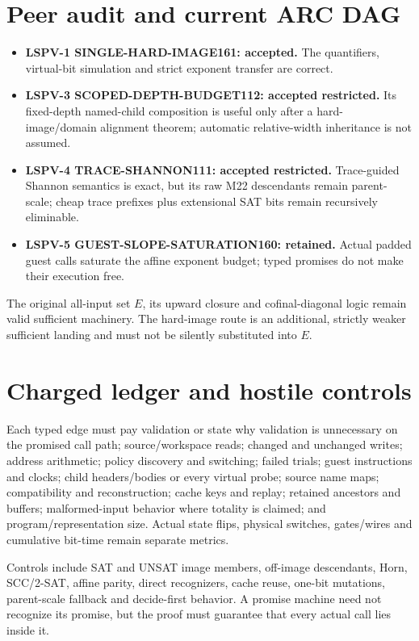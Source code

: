 \documentclass[11pt]{article}
\begin{document}
\section{Peer audit and current ARC DAG}
\begin{itemize}
\item \textbf{LSPV-1 SINGLE-HARD-IMAGE161: accepted.}  The quantifiers,
virtual-bit simulation and strict exponent transfer are correct.
\item \textbf{LSPV-3 SCOPED-DEPTH-BUDGET112: accepted restricted.}  Its
fixed-depth named-child composition is useful only after a hard-image/domain
alignment theorem; automatic relative-width inheritance is not assumed.
\item \textbf{LSPV-4 TRACE-SHANNON111: accepted restricted.}  Trace-guided
Shannon semantics is exact, but its raw M22 descendants remain parent-scale;
cheap trace prefixes plus extensional SAT bits remain recursively eliminable.
\item \textbf{LSPV-5 GUEST-SLOPE-SATURATION160: retained.}  Actual padded
guest calls saturate the affine exponent budget; typed promises do not make
their execution free.
\end{itemize}

The original all-input set $E$, its upward closure and cofinal-diagonal logic
remain valid sufficient machinery.  The hard-image route is an additional,
strictly weaker sufficient landing and must not be silently substituted into
$E$.

\section{Charged ledger and hostile controls}
Each typed edge must pay validation or state why validation is unnecessary on
the promised call path; source/workspace reads; changed and unchanged writes;
address arithmetic; policy discovery and switching; failed trials; guest
instructions and clocks; child headers/bodies or every virtual probe; source
name maps; compatibility and reconstruction; cache keys and replay; retained
ancestors and buffers; malformed-input behavior where totality is claimed; and
program/representation size.  Actual state flips, physical switches,
gates/wires and cumulative bit-time remain separate metrics.

Controls include SAT and UNSAT image members, off-image descendants, Horn,
SCC/2-SAT, affine parity, direct recognizers, cache reuse, one-bit mutations,
parent-scale fallback and decide-first behavior.  A promise machine need not
recognize its promise, but the proof must guarantee that every actual call lies
inside it.
\end{document}
